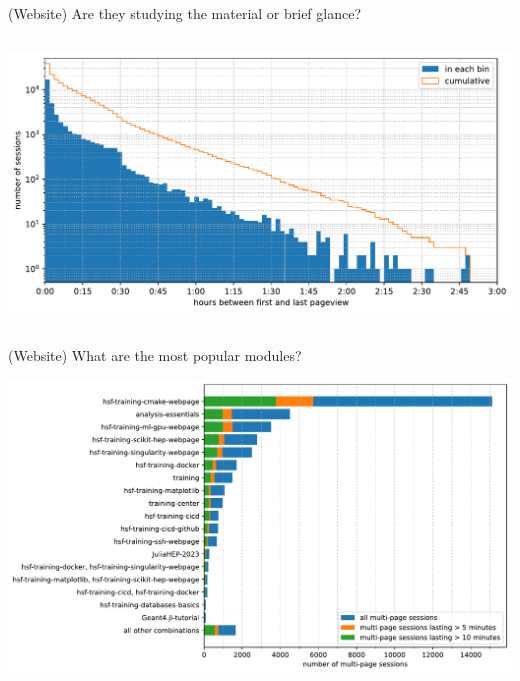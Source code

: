 \documentclass[aspectratio=169]{beamer}
\begin{document}
\begin{frame}{(Website) Are they studying the material or brief glance?}
\vspace{0.2 cm}
\begin{columns}
\includegraphics[width=\linewidth]{PLOTS/hours-per-session.pdf}
\end{columns}
\end{frame}

\begin{frame}{(Website) What are the most popular modules?}
\vspace{0.2 cm}
\begin{center}
\includegraphics[width=0.95\linewidth]{PLOTS/most-popular-modules.pdf}
\end{center}
\end{frame}
\end{document}
